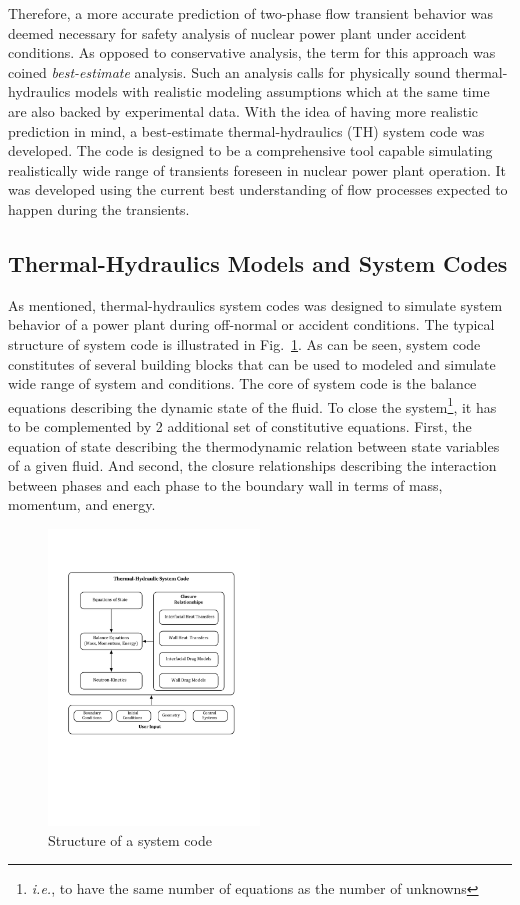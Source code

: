 \documentclass[11pt,titlepage]{article}
\begin{document}
Therefore, a more accurate prediction of two-phase flow transient behavior was deemed necessary for safety analysis of nuclear power plant under accident conditions.
As opposed to conservative analysis, the term for this approach was coined \textit{best-estimate} analysis. 
Such an analysis calls for physically sound thermal-hydraulics models with realistic modeling assumptions which at the same time are also backed by experimental data.
With the idea of having more realistic prediction in mind, a best-estimate thermal-hydraulics (TH) system code was developed.
The code is designed to be a comprehensive tool capable simulating realistically wide range of transients foreseen in nuclear power plant operation.
It was developed using the current best understanding of flow processes expected to happen during the transients.
 
\subsection{Thermal-Hydraulics Models and System Codes}

As mentioned, thermal-hydraulics system codes was designed to simulate system behavior of a power plant during off-normal or accident conditions. 
The typical structure of system code is illustrated in Fig.~\ref{fig:systemCode}. 
As can be seen, system code constitutes of several building blocks that can be used to modeled and simulate wide range of system and conditions. 
The core of system code is the balance equations describing the dynamic state of the fluid.
To close the system\footnote{\textit{i.e.}, to have the same number of equations as the number of unknowns}, it has to be complemented by 2 additional set of constitutive equations. 
First, the equation of state describing the thermodynamic relation between state variables of a given fluid. 
And second, the closure relationships describing the interaction between phases and each phase to the boundary wall in terms of mass, momentum, and energy.  
\begin{figure}[htbp]
	\centering
	\includegraphics[width=0.50\textwidth]{SystemCode.pdf}
	\caption{Structure of a system code}
	\label{fig:systemCode}
\end{figure}
\end{document}
